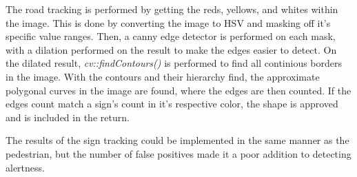 The road tracking is performed by getting the reds, yellows, and whites within the image. 
This is done by converting the image to HSV and masking off it's specific value ranges.
Then, a canny edge detector is performed on each mask, with a dilation performed on the result to make the edges easier to detect.
On the dilated result, \emph{cv::findContours()} is performed to find all continious borders in the image.
With the contours and their hierarchy find, the approximate polygonal curves in the image are found, where the edges are then counted.
If the edges count match a sign's count in it's respective color, the shape is approved and is included in the return.

The results of the sign tracking could be implemented in the same manner as the pedestrian, but the number of false positives made it a poor addition to detecting alertness.